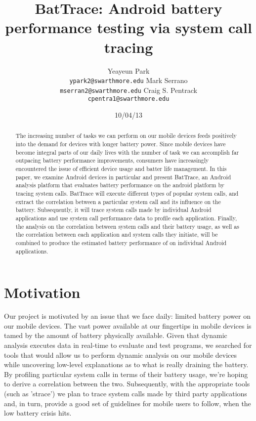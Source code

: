 \documentclass[11pt]{article}
\title{BatTrace: Android battery performance testing via system call tracing}
\author{Yeayeun Park\\
  {\tt ypark2@swarthmore.edu}  
  \And                           
  Mark Serrano\\
  {\tt mserran2@swarthmore.edu}
  \And                            
  Craig S. Pentrack\\                 
  {\tt cpentra1@swarthmore.edu}}
\date{10/04/13}
\begin{document}
\maketitle
\begin{abstract}
  The increasing number of tasks we can perform on our mobile devices 
  feeds positively into the demand for devices with longer battery power. 
  Since mobile devices have become integral parts of our daily lives with
  the number of task we can accomplish far outpacing battery performance 
  improvements, consumers have increasingly encountered the issue of 
  efficient device usage and batter life management. In this paper, we 
  examine Android devices in particular and present BatTrace, an Android 
  analysis platform that evaluates battery performance on the android platform
  by tracing system calls. BatTrace will execute different types of popular system
  calls, and extract the correlation between a particular system call and its 
  influence on the battery. Subsequently, it will trace system calls made by 
  individual Android applications and use system call performance data to profile
  each application. Finally, the analysis on the correlation between system calls and their 
  battery usage, as well as the correlation between each application and system 
  calls they initiate, will be combined to produce the estimated battery performance 
  of on individual Android applications.
\end{abstract}

\section{Motivation}

Our project is motivated by an issue that we face daily: limited battery power 
on our mobile devices. The vast power available at our fingertips in mobile
devices is tamed by the amount of battery physically available. Given 
that dynamic analysis executes data in real-time to evaluate and test programs, 
we searched for tools that would allow us to perform dynamic analysis on our 
mobile devices while uncovering low-level explanations as to what is really 
draining the battery. By profiling particular system calls in terms of their battery
usage, we're hoping to derive a correlation between the two. Subsequently, with the
appropriate tools (such as 'strace') we plan to trace system calls made by third 
party applications and, in turn, provide a good set of guidelines for mobile users 
to follow, when the low battery crisis hits.
\end{document}
